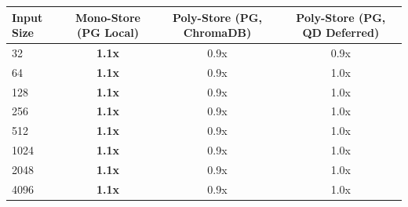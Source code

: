 \begin{tabular}{lccc}
\toprule
\textbf{Input Size} & \textbf{Mono-Store (PG Local)} & \textbf{Poly-Store (PG, ChromaDB)} & \textbf{Poly-Store (PG, QD Deferred)} \\
\midrule
32 & \textbf{1.1x} & 0.9x & 0.9x \\
64 & \textbf{1.1x} & 0.9x & 1.0x \\
128 & \textbf{1.1x} & 0.9x & 1.0x \\
256 & \textbf{1.1x} & 0.9x & 1.0x \\
512 & \textbf{1.1x} & 0.9x & 1.0x \\
1024 & \textbf{1.1x} & 0.9x & 1.0x \\
2048 & \textbf{1.1x} & 0.9x & 1.0x \\
4096 & \textbf{1.1x} & 0.9x & 1.0x \\
\bottomrule
\end{tabular}
